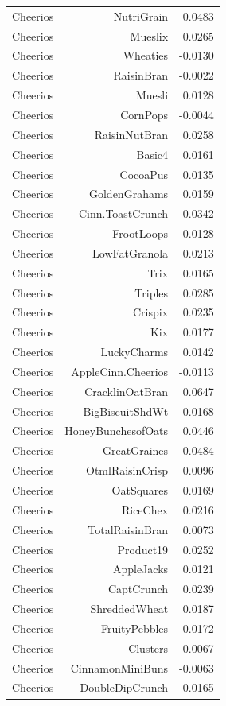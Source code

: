\begin{longtable}{@{}lrr@{}}
Cheerios & NutriGrain & 0.0483 \\
Cheerios & Mueslix & 0.0265 \\
Cheerios & Wheaties & -0.0130 \\
Cheerios & RaisinBran & -0.0022 \\
Cheerios & Muesli & 0.0128 \\
Cheerios & CornPops & -0.0044 \\
Cheerios & RaisinNutBran & 0.0258 \\
Cheerios & Basic4 & 0.0161 \\
Cheerios & CocoaPus & 0.0135 \\
Cheerios & GoldenGrahams & 0.0159 \\
Cheerios & Cinn.ToastCrunch & 0.0342 \\
Cheerios & FrootLoops & 0.0128 \\
Cheerios & LowFatGranola & 0.0213 \\
Cheerios & Trix & 0.0165 \\
Cheerios & Triples & 0.0285 \\
Cheerios & Crispix & 0.0235 \\
Cheerios & Kix & 0.0177 \\
Cheerios & LuckyCharms & 0.0142 \\
Cheerios & AppleCinn.Cheerios & -0.0113 \\
Cheerios & CracklinOatBran & 0.0647 \\
Cheerios & BigBiscuitShdWt & 0.0168 \\
Cheerios & HoneyBunchesofOats & 0.0446 \\
Cheerios & GreatGraines & 0.0484 \\
Cheerios & OtmlRaisinCrisp & 0.0096 \\
Cheerios & OatSquares & 0.0169 \\
Cheerios & RiceChex & 0.0216 \\
Cheerios & TotalRaisinBran & 0.0073 \\
Cheerios & Product19 & 0.0252 \\
Cheerios & AppleJacks & 0.0121 \\
Cheerios & CaptCrunch & 0.0239 \\
Cheerios & ShreddedWheat & 0.0187 \\
Cheerios & FruityPebbles & 0.0172 \\
Cheerios & Clusters & -0.0067 \\
Cheerios & CinnamonMiniBuns & -0.0063 \\
Cheerios & DoubleDipCrunch & 0.0165 \\

\end{longtable}
